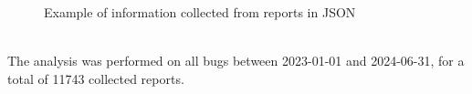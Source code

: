 \begin{figure}[h]
\caption{Example of information collected from reports in JSON}
\label{fig:report}
\end{figure}
\ \\
The analysis was performed on all bugs between 2023-01-01 and 2024-06-31, for a total of 11743 collected reports.



